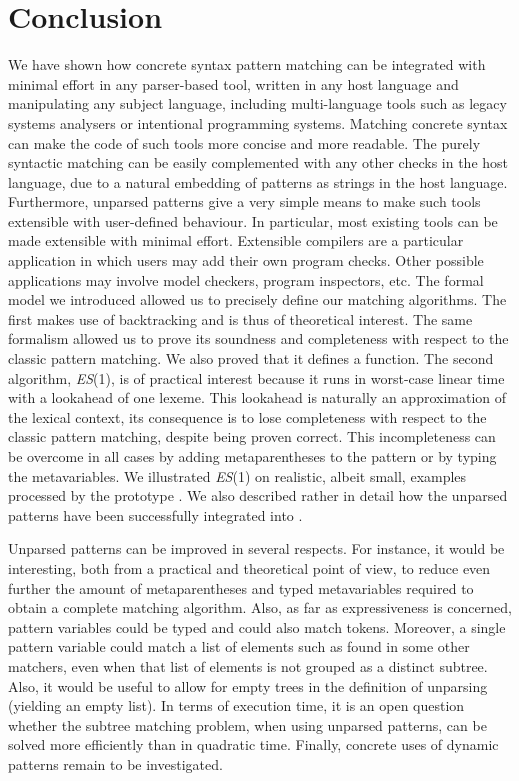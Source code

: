 
\section{Conclusion}
\label{concl}

We have shown how concrete syntax pattern matching can be integrated
with minimal effort in any parser\hyp{}based tool, written in any host
language and manipulating any subject language, including
multi\hyp{}language tools such as legacy systems analysers or
intentional programming systems. Matching concrete syntax can make the
code of such tools more concise and more readable.  The purely
syntactic matching can be easily complemented with any other checks in
the host language, due to a natural embedding of patterns as strings
in the host language. Furthermore, unparsed patterns give a very
simple means to make such tools extensible with user\hyp{}defined
behaviour. In particular, most existing tools can be made extensible
with minimal effort. Extensible compilers are a particular application
in which users may add their own program checks. Other possible
applications may involve model checkers, program inspectors, etc. The
formal model we introduced allowed us to precisely define our matching
algorithms. The first makes use of backtracking and is thus of
theoretical interest. The same formalism allowed us to prove its
soundness and completeness with respect to the classic pattern
matching. We also proved that it defines a function. The second
algorithm, \textit{ES}(1), is of practical interest because it runs in
worst\hyp{}case linear time with a lookahead of one lexeme. This
lookahead is naturally an approximation of the lexical context, its
consequence is to lose completeness with respect to the classic
pattern matching, despite being proven correct. This incompleteness
can be overcome in all cases by adding meta\-parentheses to the
pattern or by typing the meta\-variables. We illustrated
\textit{ES}(1) on realistic, albeit small, examples processed by the
prototype \Matchbox. We also described rather in detail how the
unparsed patterns have been successfully integrated into \GCC.

Unparsed patterns can be improved in several respects. For instance,
it would be interesting, both from a practical and theoretical point
of view, to reduce even further the amount of meta\-parentheses and
typed meta\-variables required to obtain a complete matching
algorithm. Also, as far as expressiveness is concerned, pattern
variables could be typed and could also match tokens. Moreover, a
single pattern variable could match a list of elements such as found
in some other matchers, even when that list of elements is not grouped
as a distinct subtree. Also, it would be useful to allow for empty
trees in the definition of unparsing (yielding an empty list). In
terms of execution time, it is an open question whether the subtree
matching problem, when using unparsed patterns, can be solved more
efficiently than in quadratic time. Finally, concrete uses of dynamic
patterns remain to be investigated.
